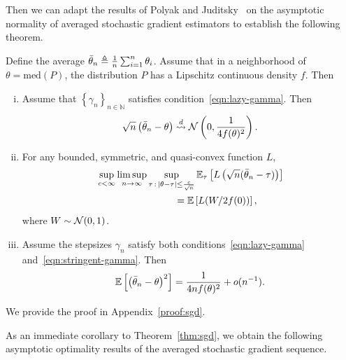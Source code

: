 Then we can adapt the results of Polyak and Juditsky~\cite{PolyakJu92}
on the asymptotic normality of averaged stochastic gradient estimators
to establish the following theorem.
\begin{thm}
  \label{thm:sgd}
  Define the average $\bar{\theta}_n \triangleq \frac{1}{n}
  \sum_{i = 1}^n \theta_i$. Assume
  that in a neighborhood
  of $\theta = \mbox{med}(P)$,
  the distribution $P$ has a Lipschitz continuous density $f$.
  Then
  \begin{enumerate}[(i)]
  \item \label{item:normal-sgd}
    Assume that $\left\{ \gamma_n \right\}_{n\in \mathbb N}$ satisfies
    condition~\eqref{eqn:lazy-gamma}.
    Then
    \begin{equation*}
      \sqrt{n}\left( \bar{\theta}_n - \theta\right)
      \stackrel{d}{\rightsquigarrow} \mathcal{N}\left(0,\frac{1}{4 f(\theta)^2}\right).
    \end{equation*}
  \item \label{item:sgd-regular}
    For any bounded, symmetric, and quasi-convex function $L$, 
    \begin{align} 
      & \sup_{c < \infty} \limsup_{n \to \infty}
      \sup_{\tau\,:\,|\theta-\tau| \leq \frac{c}{\sqrt{n} }}
      \mathbb{E}_\tau \left[ L\left( \sqrt{n}(\bar{\theta}_{n} - \tau) \right) \right] \nonumber 
      \\
      & \qquad \qquad \qquad \qquad = \mathbb E \left[L(W/ 2 f(0)) \right],
        \label{eq:attaining_LAM}
    \end{align}
    where $W \sim \mathcal{N}(0,1)$. 
  \item \label{item:sgd-ms-convergence}
    Assume the stepsizes $\gamma_n$ satisfy both
    conditions~\eqref{eqn:lazy-gamma} and~\eqref{eqn:stringent-gamma}.
    Then
    \begin{equation*}
      \mathbb{E}\left[ \left( \bar{\theta}_n - \theta \right)^2\right] = \frac{1}{4 n f(\theta)^2} + o(n^{-1}). 
    \end{equation*}
  \end{enumerate}
\end{thm}

\noindent
We provide the proof in Appendix~\ref{proof:sgd}.

As an immediate corollary to Theorem~\ref{thm:sgd}, we obtain the following
asymptotic optimality results of the averaged stochastic gradient
sequence.

